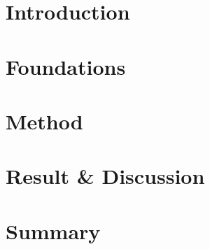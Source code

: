 \tableofcontents
\listoffigures
\listoftables

\pagebreak


\fancyfoot[CE,LO]{\leftmark}
\fancyfoot[CE,CO]{ }

\part{Introduction}


\pagebreak
\part{Foundations}


\pagebreak
\part{Method}


\pagebreak
\part{Result \& Discussion}


\pagebreak
\part{Summary}




\pagebreak
\printbibliography

%









